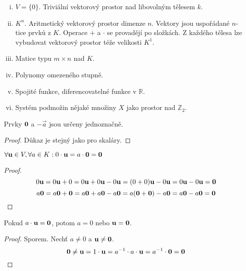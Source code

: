 \begin{remark}
    \leavevmode
    \begin{enumerate}[i.]
        \item $V = \{0\}.$ Triviální vektorový prostor nad libovolným tělesem 
            $k$.
        \item $K^n.$ Aritmetický vektorový prostor dimenze $n$. 
            Vektory jsou uspořádané $n$-tice prvků z $K$. Operace $+$ a $\cdot$
            se provadějí po složkách. Z každého tělesa lze vybudovat vektorový 
            prostor téže velikosti $K^1$.
        \item Matice typu $m \times n$ nad $K$.
        \item Polynomy omezeného stupně.
        \item Spojité funkce, diferencovatelné funkce v $\mathbb{R}$.
        \item Systém podmožin nějaké množiny $X$ jako prostor nad $\mathbb{Z}_2$.
    \end{enumerate}
\end{remark}

\begin{proposition}
    Prvky $\mathbf{0}$ a $-\vec{a}$ jsou určeny jednoznačně.
\end{proposition}

\begin{proof}
    Důkaz je stejný jako pro skaláry.
\end{proof}

\begin{proposition}
    $\forall \mathbf{u} \in V, \forall a \in K: 0 \cdot \mathbf{u} = a \cdot \mathbf{0} = \mathbf{0}$
\end{proposition}

\begin{proof}
    $$0\mathbf{u} = 0\mathbf{u} + 0 = 0\mathbf{u} + 0\mathbf{u} - 0\mathbf{u} = (0 + 0)\mathbf{u} - 0\mathbf{u} = 0\mathbf{u} - 0\mathbf{u} = 
    \mathbf{0}$$
    $$a\mathbf{0} = a\mathbf{0} + \mathbf{0} = a\mathbf{0} + a\mathbf{0} - a\mathbf{0} = a(\mathbf{0} + \mathbf{0}) 
    - a\mathbf{0} = a\mathbf{0} - a\mathbf{0} = \mathbf{0}$$
\end{proof}

\begin{proposition}
    Pokud $a\cdot\mathbf{u} = \mathbf{0}$, potom $a = 0$ nebo $\mathbf{u} = \mathbf{0}$.
\end{proposition}

\begin{proof}
    Sporem. Nechť $a \neq 0$ a $\mathbf{u} \neq \mathbf{0}$.
    $$\mathbf{0} \neq \mathbf{u} = 1 \cdot \mathbf{u} = a^{-1} \cdot a \cdot \mathbf{u} = 
    a^{-1} \cdot \mathbf{0} = \mathbf{0}$$
\end{proof}

